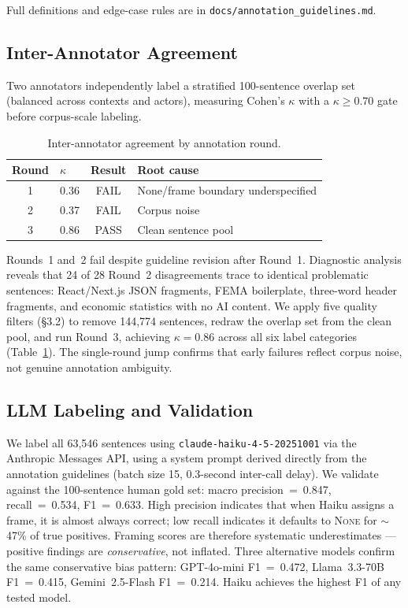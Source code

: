 \documentclass[11pt,a4paper,twocolumn]{article}
\begin{document}
Full definitions and edge-case rules are in \texttt{docs/annotation\_guidelines.md}.

\subsection{Inter-Annotator Agreement}

Two annotators independently label a stratified 100-sentence overlap set
(balanced across contexts and actors), measuring Cohen's $\kappa$
\citep{landis1977measurement} with a $\kappa \geq 0.70$ gate before corpus-scale
labeling.

\begin{table}[t]
\centering
\caption{Inter-annotator agreement by annotation round.}
\label{tab:kappa}
\small
\begin{tabular}{clcp{3.2cm}}
\toprule
\textbf{Round} & \textbf{$\kappa$} & \textbf{Result} & \textbf{Root cause} \\
\midrule
1 & 0.36 & FAIL & None/frame boundary underspecified \\
2 & 0.37 & FAIL & Corpus noise \\
3 & 0.86 & PASS & Clean sentence pool \\
\bottomrule
\end{tabular}
\end{table}

Rounds~1 and~2 fail despite guideline revision after Round~1.
Diagnostic analysis reveals that 24 of 28 Round~2 disagreements trace to
identical problematic sentences: React/Next.js JSON fragments, FEMA boilerplate,
three-word header fragments, and economic statistics with no AI content. We
apply five quality filters (§3.2) to remove 144,774 sentences, redraw the
overlap set from the clean pool, and run Round~3, achieving $\kappa = 0.86$
across all six label categories (Table~\ref{tab:kappa}). The single-round
jump confirms that early failures reflect corpus noise, not genuine annotation
ambiguity.

\subsection{LLM Labeling and Validation}

We label all 63,546 sentences using \texttt{claude-haiku-4-5-20251001} via the
Anthropic Messages API, using a system prompt derived directly from the
annotation guidelines (batch size 15, 0.3-second inter-call delay).
We validate against the 100-sentence human gold set: macro precision~=~0.847,
recall~=~0.534, F1~=~0.633. High precision indicates that when Haiku assigns
a frame, it is almost always correct; low recall indicates it defaults to
\textsc{None} for $\sim$47\% of true positives. Framing scores are therefore
systematic underestimates — positive findings are \emph{conservative}, not
inflated. Three alternative models confirm the same conservative bias pattern:
GPT-4o-mini F1~=~0.472, Llama~3.3-70B F1~=~0.415, Gemini~2.5-Flash F1~=~0.214.
Haiku achieves the highest F1 of any tested model.
\end{document}
